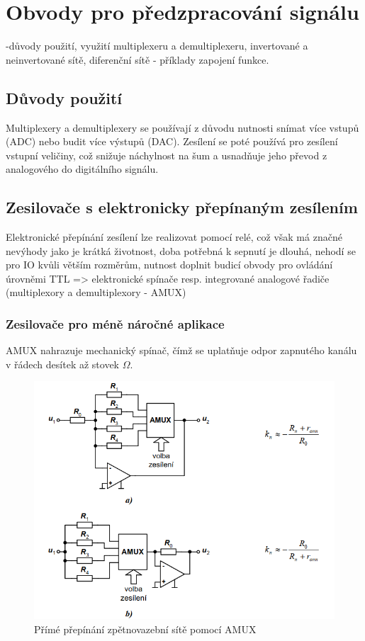 \section{Obvody pro předzpracování signálu}
-důvody použití, využití multiplexeru a demultiplexeru, invertované a neinvertované sítě, diferenční sítě - příklady zapojení funkce.

\subsection{Důvody použití}
Multiplexery a demultiplexery se používají z důvodu nutnosti snímat více vstupů (ADC) nebo budit více výstupů (DAC). Zesílení se poté používá pro zesílení vstupní veličiny, což snižuje náchylnost na šum a usnadňuje jeho převod z analogového do digitálního signálu.

\subsection{Zesilovače s elektronicky přepínaným zesílením}
Elektronické přepínání zesílení lze realizovat pomocí relé, což však má značné nevýhody jako je krátká životnost, doba potřebná k sepnutí je dlouhá, nehodí se pro IO kvůli větším rozměrům, nutnost doplnit budicí obvody pro ovládání úrovněmi TTL => elektronické spínače resp. integrované analogové řadiče (multiplexory a demultiplexory - AMUX)
\subsubsection{Zesilovače pro méně náročné aplikace}
AMUX nahrazuje mechanický spínač, čímž se uplatňuje odpor zapnutého kanálu v řádech desítek až stovek $\Omega$.
\begin{figure}[h]
   \begin{center}
     \includegraphics[scale=0.6]{images/Amux1.png}
   \end{center}
   \caption{Přímé přepínání zpětnovazební sítě pomocí AMUX}
\end{figure}

